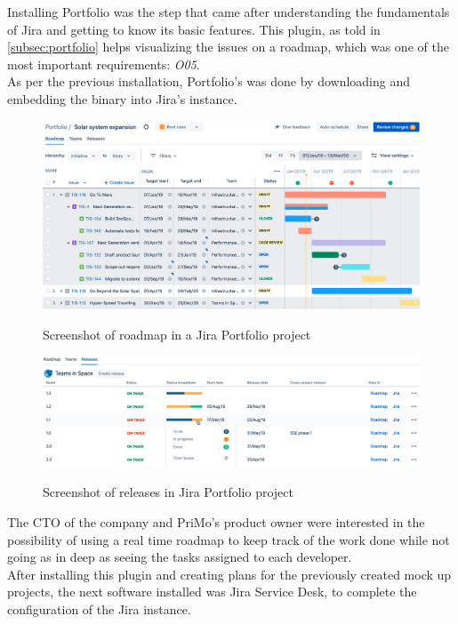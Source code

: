 	Installing Portfolio was the step that came after understanding the fundamentals of Jira and getting to know its basic features.
	This plugin, as told in \ref{subsec:portfolio} helps visualizing the issues on a roadmap, which was one of the most important requirements: \textit{O05}.\\
	As per the previous installation, Portfolio's was done by downloading and embedding the binary into Jira's instance.
	\begin{figure}[H]
		\centering
		\includegraphics[width=\textwidth]{resources/portfolio}\\
		\caption[Screenshot of roadmap in a Jira Portfolio project]{Screenshot of roadmap in a Jira Portfolio project\cite{portfolio}}
	\end{figure}
	\begin{figure}[H]
		\centering
		\includegraphics[width=\textwidth]{resources/IPS}\\
		\caption[Screenshot of releases in Jira Portfolio project]{Screenshot of releases in Jira Portfolio project\cite{portfolio}}
	\end{figure}
	The CTO of the company and PriMo's product owner were interested in the possibility of using a real time roadmap to keep track of the work done while not going as in deep as seeing the tasks assigned to each developer.\\
	After installing this plugin and creating plans for the previously created mock up projects, the next software installed was Jira Service Desk, to complete the configuration of the Jira instance.
